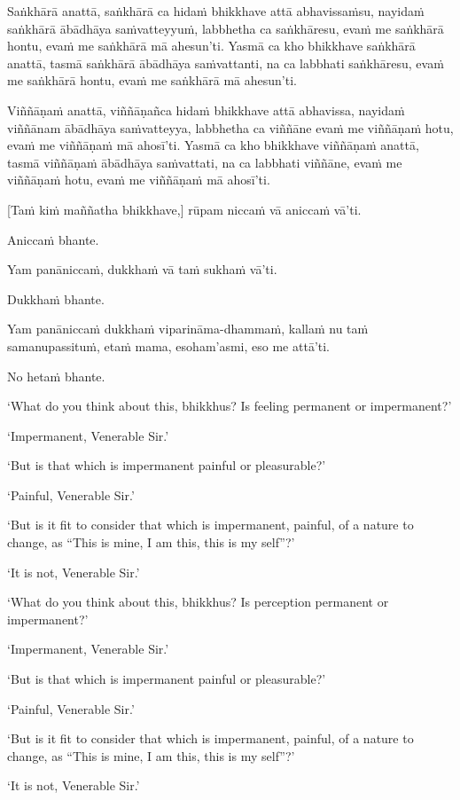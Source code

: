 Saṅkhārā anattā, saṅkhārā ca hidaṁ bhikkhave attā abhavissaṁsu, nayidaṁ saṅkhārā
ābādhāya saṁvatteyyuṁ, labbhetha ca saṅkhāresu, evaṁ me saṅkhārā hontu, evaṁ me
saṅkhārā mā ahesun'ti. Yasmā ca kho bhikkhave saṅkhārā anattā, tasmā saṅkhārā
ābādhāya saṁvattanti, na ca labbhati saṅkhāresu, evaṁ me saṅkhārā hontu, evaṁ me
saṅkhārā mā ahesun'ti.

Viññāṇaṁ anattā, viññāṇañca hidaṁ bhikkhave attā abhavissa, nayidaṁ viññānam
ābādhāya saṁvatteyya, labbhetha ca viññāne evaṁ me viññāṇaṁ hotu, evaṁ me
viññāṇaṁ mā ahosī'ti. Yasmā ca kho bhikkhave viññāṇaṁ anattā, tasmā viññāṇaṁ
ābādhāya saṁvattati, na ca labbhati viññāne, evaṁ me viññāṇaṁ hotu, evaṁ me
viññāṇaṁ mā ahosī'ti.

[Taṁ kiṁ maññatha bhikkhave,] rūpam niccaṁ vā aniccaṁ vā'ti.

Aniccaṁ bhante.

Yam panāniccaṁ, dukkhaṁ vā taṁ sukhaṁ vā'ti.

Dukkhaṁ bhante.

Yam panāniccaṁ dukkhaṁ viparināma-dhammaṁ, kallaṁ nu taṁ samanupassituṁ,
etaṁ mama, esoham'asmi, eso me attā'ti.

No hetaṁ bhante.

\clearpage

\englishText
\markboth{\englishTitle}{\rightmark}

‘What do you think about this, bhikkhus? Is feeling permanent or
impermanent?’

‘Impermanent, Venerable Sir.’

‘But is that which is impermanent painful or pleasurable?’

‘Painful, Venerable Sir.’

‘But is it fit to consider that which is impermanent, painful, of a
nature to change, as “This is mine, I am this, this is my self”?’

‘It is not, Venerable Sir.’

‘What do you think about this, bhikkhus? Is perception permanent or
impermanent?’

‘Impermanent, Venerable Sir.’

‘But is that which is impermanent painful or pleasurable?’

‘Painful, Venerable Sir.’

‘But is it fit to consider that which is impermanent, painful, of a
nature to change, as “This is mine, I am this, this is my self”?’

‘It is not, Venerable Sir.’

